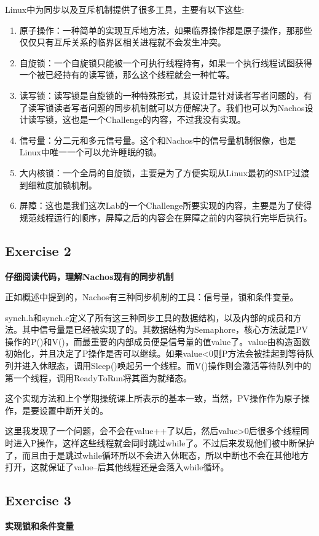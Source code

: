 \documentclass{ctexart}
\begin{document}
Linux中为同步以及互斥机制提供了很多工具，主要有以下这些:
\begin{enumerate}
\item 原子操作：一种简单的实现互斥地方法，如果临界操作都是原子操作，那那些仅仅只有互斥关系的临界区相关进程就不会发生冲突。
\item 自旋锁：一个自旋锁只能被一个可执行线程持有，如果一个执行线程试图获得一个被已经持有的读写锁，那么这个线程就会一种忙等。 
\item 读写锁：读写锁是自旋锁的一种特殊形式，其设计是针对读者写者问题的，有了读写锁读者写者问题的同步机制就可以方便解决了。我们也可以为Nachos设计读写锁，这也是一个Challenge的内容，不过我没有实现。
\item 信号量：分二元和多元信号量。这个和Nachos中的信号量机制很像，也是Linux中唯一一个可以允许睡眠的锁。
\item 大内核锁：一个全局的自旋锁，主要是为了方便实现从Linux最初的SMP过渡到细粒度加锁机制。
\item 屏障：这也是我们这次Lab的一个Challenge所要实现的内容，主要是为了使得规范线程运行的顺序，屏障之后的内容会在屏障之前的内容执行完毕后执行。
\end{enumerate}

\subsection*{Exercise 2}
\textbf{仔细阅读代码，理解Nachos现有的同步机制}

正如概述中提到的，Nachos有三种同步机制的工具：信号量，锁和条件变量。

synch.h和synch.c定义了所有这三种同步工具的数据结构，以及内部的成员和方法。其中信号量是已经被实现了的。其数据结构为Semaphore，核心方法就是PV操作的P()和V()，而最重要的内部成员便是信号量的值value了。value由构造函数初始化，并且决定了P操作是否可以继续。如果value<0则P方法会被挂起到等待队列并进入休眠态，调用Sleep()唤起另一个线程。而V()操作则会激活等待队列中的第一个线程，调用ReadyToRun将其置为就绪态。

这个实现方法和上个学期操统课上所表示的基本一致，当然，PV操作作为原子操作，是要设置中断开关的。

这里我发现了一个问题，会不会在value++了以后，然后value>0后很多个线程同时进入P操作，这样这些线程就会同时跳过while了。不过后来发现他们被中断保护了，而且由于是跳过while循环所以不会进入休眠态，所以中断也不会在其他地方打开，这就保证了value--后其他线程还是会落入while循环。

\subsection*{Exercise 3}
\textbf{实现锁和条件变量}
\end{document}
